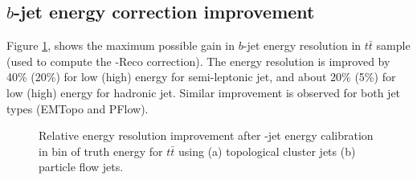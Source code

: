 \subsection{$b$-jet energy correction improvement}
\label{Jet:Cal:BCal:Result}
Figure \ref{fig:Jet:Cal:BCal:Result:E}, shows the maximum possible gain in $b$-jet energy resolution in $t\bar{t}$ sample (used to compute the \pT-Reco correction). The energy resolution is improved by 40\% (20\%) for low (high) energy for semi-leptonic jet, and about 20\% (5\%) for low (high) energy for hadronic jet. Similar improvement is observed for both jet types (EMTopo and PFlow).
\begin{figure}[htbp]
   \centering
   \quad
   \begin{tcolorbox}[colback=black!5!white,colframe=white!75!black]
   \caption{Relative energy resolution improvement after \bq-jet energy calibration in bin of truth energy for $t\bar{t}$ using (a) topological cluster jets (b) particle flow jets.}
    \label{fig:Jet:Cal:BCal:Result:E}
   \end{tcolorbox}
\end{figure}
